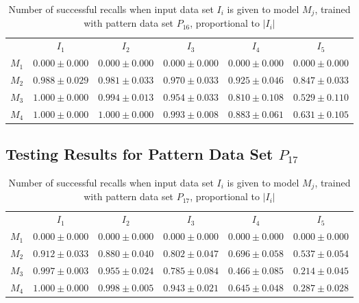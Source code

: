 \documentclass[anon]{CI}
\begin{document}
		\begin{table}[H]
			\centering
			\def\arraystretch{1.5}
			\footnotesize
			\begin{tabular}{cccccc}
				
				& $I_{1}$  & $I_{2}$  & $I_{3}$  & $I_{4}$  & $I_{5}$ \\ \cline{2-6}
				$M_{1}$  & $0.000\pm0.000$  & $0.000\pm0.000$  & $0.000\pm0.000$  & $0.000\pm0.000$  & $0.000\pm0.000$ \\
				$M_{2}$  & $0.988\pm0.029$  & $0.981\pm0.033$  & $0.970\pm0.033$  & $0.925\pm0.046$  & $0.847\pm0.033$ \\
				$M_{3}$  & $1.000\pm0.000$  & $0.994\pm0.013$  & $0.954\pm0.033$  & $0.810\pm0.108$  & $0.529\pm0.110$ \\
				$M_{4}$  & $1.000\pm0.000$  & $1.000\pm0.000$  & $0.993\pm0.008$  & $0.883\pm0.061$  & $0.631\pm0.105$ \\
				
			\end{tabular}
			\caption{Number of successful recalls when input data set $I_i$ is given to model $M_j$, trained with pattern data set $P_{16}$, proportional to $\left|I_i\right|$}
		\end{table}
		
		\subsection{Testing Results for Pattern Data Set $P_{17}$}
		
		
		\begin{table}[H]
			\centering
			\def\arraystretch{1.5}
			\footnotesize
			\begin{tabular}{cccccc}
				
				& $I_{1}$  & $I_{2}$  & $I_{3}$  & $I_{4}$  & $I_{5}$ \\ \cline{2-6}
				$M_{1}$  & $0.000\pm0.000$  & $0.000\pm0.000$  & $0.000\pm0.000$  & $0.000\pm0.000$  & $0.000\pm0.000$ \\
				$M_{2}$  & $0.912\pm0.033$  & $0.880\pm0.040$  & $0.802\pm0.047$  & $0.696\pm0.058$  & $0.537\pm0.054$ \\
				$M_{3}$  & $0.997\pm0.003$  & $0.955\pm0.024$  & $0.785\pm0.084$  & $0.466\pm0.085$  & $0.214\pm0.045$ \\
				$M_{4}$  & $1.000\pm0.000$  & $0.998\pm0.005$  & $0.943\pm0.021$  & $0.645\pm0.048$  & $0.287\pm0.028$ \\
				
			\end{tabular}
			\caption{Number of successful recalls when input data set $I_i$ is given to model $M_j$, trained with pattern data set $P_{17}$, proportional to $\left|I_i\right|$}
		\end{table}
		
\end{document}
